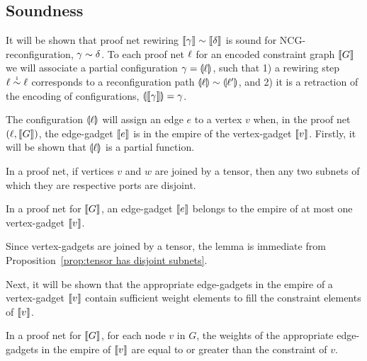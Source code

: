 \documentclass[conference]{IEEEtran}
\let\aftersubsection=\noindent
\let\capsabbrev=\uppercase
\begin{document}

\subsection*{Soundness}

\aftersubsection
It will be shown that proof net rewiring $\itn\gamma\perm\itn\delta$ is sound for \capsabbrev{ncg}-reconfiguration, $\gamma\perm\delta$.
%
To each proof net $\ell$ for an encoded constraint graph $\llbracket G\rrbracket$ we will associate a partial configuration $\gamma=\llparenthesis\ell\rrparenthesis$, such that 1) a rewiring step $\links\perm*\links$ corresponds to a reconfiguration path $\coitn\links\perm\coitn{\links'}$, and 2) it is a retraction of the encoding of configurations, $\llparenthesis\llbracket\gamma\rrbracket\rrparenthesis=\gamma$.



The configuration $\llparenthesis\ell\rrparenthesis$ will assign an edge $e$ to a vertex $v$ when, in the proof net $(\ell,\llbracket G\rrbracket)$, the edge-gadget $\llbracket e\rrbracket$ is in the empire of the vertex-gadget $\llbracket v\rrbracket$.
%
Firstly, it will be shown that $\llparenthesis\ell\rrparenthesis$ is a partial function.


\begin{proposition}
\label{prop:tensor has disjoint subnets}
In a proof net, if vertices $v$ and $w$ are joined by a tensor, then any two subnets of which they are respective ports are disjoint.
\end{proposition}


\begin{lemma}
In a proof net for $\llbracket G\rrbracket$, an edge-gadget $\llbracket e\rrbracket$ belongs to the empire of at most one vertex-gadget $\llbracket v\rrbracket$.
\end{lemma}

\begin{IEEEproof}
Since vertex-gadgets are joined by a tensor, the lemma is immediate from Proposition~\ref{prop:tensor has disjoint subnets}.
\end{IEEEproof}


Next, it will be shown that the appropriate edge-gadgets in the empire of a vertex-gadget $\llbracket v\rrbracket$ contain sufficient weight elements to fill the constraint elements of $\llbracket v\rrbracket$.


\begin{lemma}
\label{lem:appropriate edge weights}
In a proof net for $\llbracket G\rrbracket$, for each node $v$ in $G$, the weights of the appropriate edge-gadgets in the empire of $\llbracket v\rrbracket$ are equal to or greater than the constraint of $v$.
\end{lemma}
\end{document}
